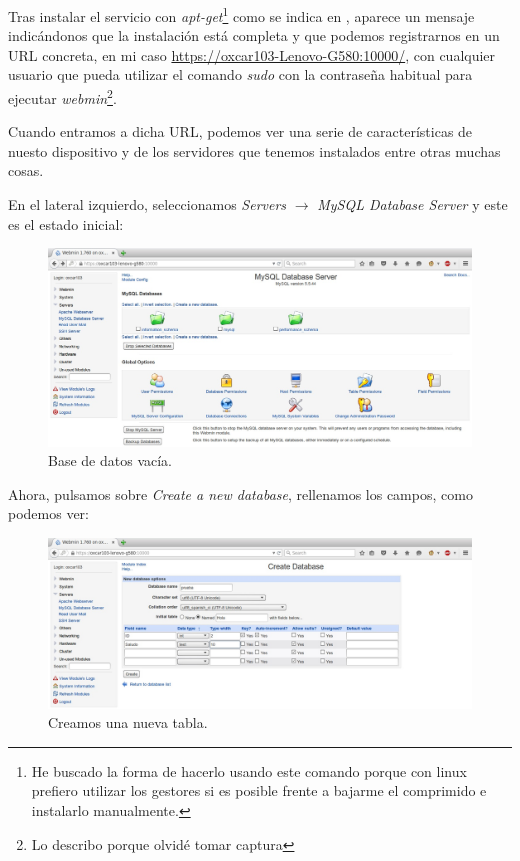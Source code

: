 \documentclass[paper=a4, fontsize=11pt]{scrartcl} %
\numberwithin{equation}{section} %
\numberwithin{figure}{section} %
\numberwithin{table}{section} %
\begin{document}
\begin{enumerate}
		Tras instalar el servicio con \textit{apt-get}\footnote{He buscado la forma de hacerlo usando
		este comando porque con linux prefiero utilizar los gestores si es posible frente a bajarme el
		comprimido e instalarlo manualmente.} como se indica en \cite{webmin}, aparece un mensaje
		indicándonos que la instalación está completa y que podemos registrarnos en un URL concreta,
		en mi caso \url{https://oxcar103-Lenovo-G580:10000/}, con cualquier usuario que pueda utilizar
		el comando \textit{sudo} con la contraseña habitual para ejecutar \textit{webmin}\footnote{Lo
		describo porque olvidé tomar captura}.
		
		Cuando entramos a dicha URL, podemos ver una serie de características de nuesto dispositivo y
		de los servidores que tenemos instalados entre otras muchas cosas.
		
		En el lateral izquierdo, seleccionamos \textit{Servers} $\rightarrow$ \textit{MySQL Database
		Server} y este es el estado inicial:
		
		\begin{figure}[H]
			\centering
			\includegraphics[width=15cm]{Ejercicio_19a.jpg}
			\caption{Base de datos vacía.}
			\label{fig:initial}
		\end{figure}
		
		Ahora, pulsamos sobre \textit{Create a new database}, rellenamos los campos, como podemos ver:
		
		\begin{figure}[H]
			\centering
			\includegraphics[width=15cm]{Ejercicio_19b.jpg}
			\caption{Creamos una nueva tabla.}
			\label{fig:new}
		\end{figure}
		

\end{enumerate}
\end{document}
